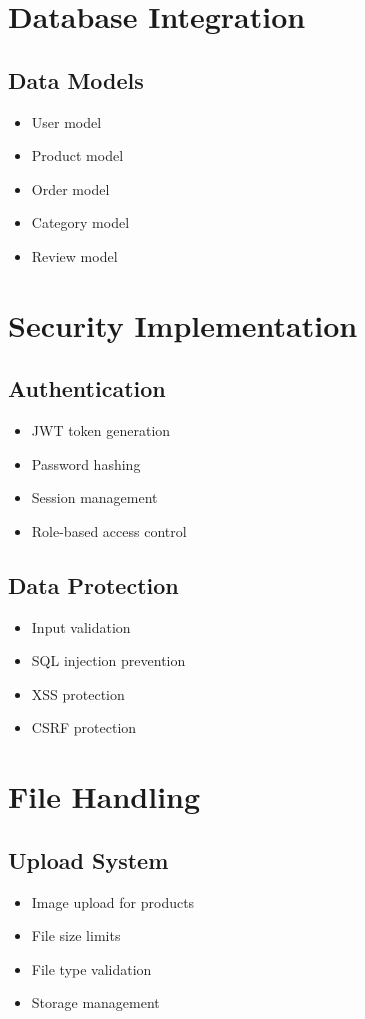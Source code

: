 \section{Database Integration}
\subsection{Data Models}
\begin{itemize}
    \item User model
    \item Product model
    \item Order model
    \item Category model
    \item Review model
\end{itemize}

\section{Security Implementation}
\subsection{Authentication}
\begin{itemize}
    \item JWT token generation
    \item Password hashing
    \item Session management
    \item Role-based access control
\end{itemize}

\subsection{Data Protection}
\begin{itemize}
    \item Input validation
    \item SQL injection prevention
    \item XSS protection
    \item CSRF protection
\end{itemize}

\section{File Handling}
\subsection{Upload System}
\begin{itemize}
    \item Image upload for products
    \item File size limits
    \item File type validation
    \item Storage management
\end{itemize}

